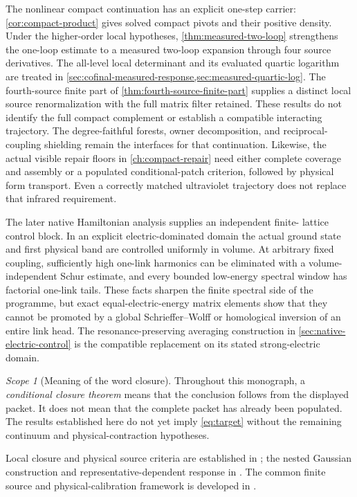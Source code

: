 \documentclass[11pt,oneside,openany]{book}
\theoremstyle{definition}
\theoremstyle{remark}
\newtheorem{scope}[scope]{Scope}
\newcommand{\src}[2]{\cite[#2]{#1}}
\newcommand{\sourcebasis}[1]{\par\smallskip\noindent #1\par}
\begin{document}
The nonlinear compact continuation has an explicit one-step carrier:
\cref{cor:compact-product} gives solved compact pivots and their
positive density. Under the higher-order local hypotheses,
\cref{thm:measured-two-loop} strengthens the one-loop estimate to a
measured two-loop expansion through four source derivatives.
The all-level local determinant and its evaluated quartic logarithm
are treated in \cref{sec:cofinal-measured-response,sec:measured-quartic-log}.
The fourth-source finite part of
\cref{thm:fourth-source-finite-part} supplies a distinct local source
renormalization with the full matrix filter retained. These results
do not identify the full compact complement or establish a compatible
interacting trajectory. The degree-faithful forests, owner decomposition,
and reciprocal-coupling shielding remain the interfaces for that
continuation. Likewise, the actual visible repair floors in
\cref{ch:compact-repair} need either complete coverage and assembly or a
populated conditional-patch criterion, followed by physical form
transport. Even a correctly matched ultraviolet trajectory does not
replace that infrared requirement.

The later native Hamiltonian analysis supplies an independent finite-
lattice control block. In an explicit electric-dominated domain the
actual ground state and first physical band are controlled uniformly in
volume. At arbitrary fixed coupling, sufficiently high one-link
harmonics can be eliminated with a volume-independent Schur estimate,
and every bounded low-energy spectral window has factorial one-link
tails. These facts sharpen the finite spectral side of the programme,
but exact equal-electric-energy matrix elements show that they cannot
be promoted by a global Schrieffer--Wolff or homological inversion of an
entire link head. The resonance-preserving averaging construction in
\cref{sec:native-electric-control} is the compatible replacement on its
stated strong-electric domain.

\begin{scope}[Meaning of the word closure]
Throughout this monograph, a \emph{conditional closure theorem} means that the conclusion follows from the displayed packet. It does not mean that the complete packet has already been populated. The results established here do not yet imply \cref{eq:target} without the remaining continuum and physical-contraction hypotheses.
\end{scope}
\sourcebasis{Local closure and physical source criteria are established in \src{F1}{V1--V4}; the nested Gaussian construction and representative-dependent response in \src{F11}{V31--V41}. The common finite source and physical-calibration framework is developed in \cite{GT}.}
\end{document}
